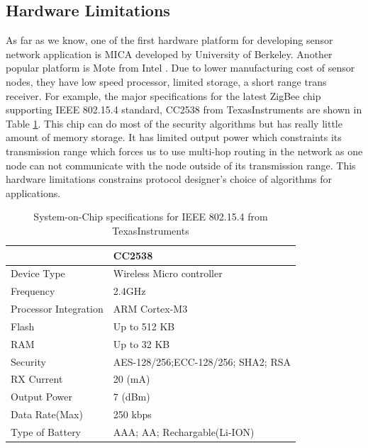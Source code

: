 	\subsection{Hardware Limitations}
		As far as we know, one of the first hardware platform for developing sensor network application is MICA \cite{hill2002mica} developed by University of Berkeley.
		Another popular platform is Mote from Intel \cite{arazi2006self}.
		Due to lower manufacturing cost of sensor nodes, they have low speed processor, limited storage, a short range trans receiver.
		For example, the major specifications for the latest ZigBee chip supporting IEEE 802.15.4 standard, CC2538 from TexasInstruments are shown in Table \ref{table:soc}.
		This chip can do most of the security algorithms but has really little amount of memory storage. It has limited output power which constraints its transmission range which forces us to use multi-hop routing in the network as one node can not communicate with the node outside of its transmission range.
		This hardware limitations constrains protocol designer's choice of algorithms for applications.  
		\begin{table}[!htb]	
			\begin{center}
				\begin{tabular}{ |l| l| }
					\hline
				     & CC2538 \\
				    \hline
				    Device Type & Wireless Micro controller \\
				    Frequency & 2.4GHz \\
				    Processor Integration & ARM Cortex-M3 \\
						Flash & Up to 512 KB \\
						RAM & Up to 32 KB \\
						Security & AES-128/256;ECC-128/256; SHA2; RSA \\
						RX Current & 20 (mA) \\
						Output Power & 7 (dBm) \\
						Data Rate(Max) & 250 kbps \\
						Type of Battery & AAA; AA; Rechargable(Li-ION) \\
				    \hline
				\end{tabular}
			\end{center}
			 \caption{System-on-Chip specifications for IEEE 802.15.4 from TexasInstruments}
			 \label{table:soc}
		\end{table}
	
